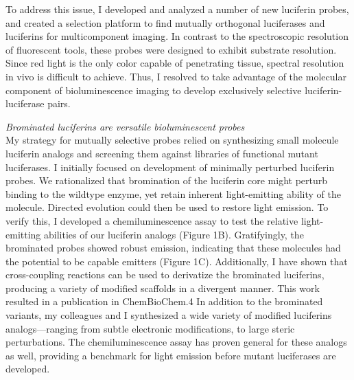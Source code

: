 \documentclass[11pt]{article}
\begin{document}
To address this issue, I developed and analyzed a number of new luciferin probes, and created a selection platform to find mutually orthogonal luciferases and luciferins for multicomponent imaging. In contrast to the spectroscopic resolution of fluorescent tools, these probes were designed to exhibit substrate resolution. Since red light is the only color capable of penetrating tissue, spectral resolution in vivo is difficult to achieve.
Thus, I resolved to take advantage of the molecular component of bioluminescence imaging to develop exclusively selective luciferin-luciferase pairs.

\textit{Brominated luciferins are versatile bioluminescent probes}\\ %
My strategy for mutually selective probes relied on synthesizing small molecule luciferin analogs and screening them against libraries of functional mutant luciferases. I initially focused on development of minimally perturbed luciferin probes. We rationalized that bromination of the luciferin core might perturb binding to the wildtype enzyme, yet retain inherent light-emitting ability of the molecule. Directed evolution could then be used to restore light emission. To verify this, I developed a chemiluminescence assay to test the relative light-emitting abilities of our luciferin analogs (Figure 1B). Gratifyingly, the brominated probes showed robust emission, indicating that these molecules had the potential to be capable emitters (Figure 1C). Additionally, I have shown that cross-coupling reactions can be used to derivatize the brominated luciferins, producing a variety of modified scaffolds in a divergent manner. This work resulted in a publication in ChemBioChem.4 In addition to the brominated variants, my colleagues and I synthesized a wide variety of modified luciferins analogs—ranging from subtle electronic modifications, to large steric perturbations. The chemiluminescence assay has proven general for these analogs as well, providing a benchmark for light emission before mutant luciferases are developed.
\end{document}
